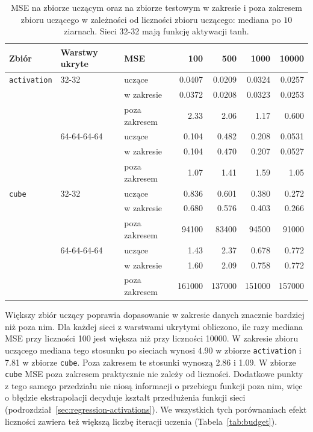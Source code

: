 \begin{table}[H]
    \centering
    \caption{MSE na zbiorze uczącym oraz na zbiorze testowym w zakresie i poza zakresem zbioru uczącego w zależności od liczności zbioru uczącego: mediana po $10$ ziarnach. Sieci 32-32 mają funkcję aktywacji tanh.}
    \label{tab:cross-size-regression}
    \begin{tabular}{lllrrrr}
        \toprule
        Zbiór & Warstwy ukryte & MSE & \num{100} & \num{500} & \num{1000} & \num{10000} \\
        \midrule
        \texttt{activation} & 32-32 & uczące & \num{0.0407} & \num{0.0209} & \num{0.0324} & \num{0.0257} \\
        & & w zakresie & \num{0.0372} & \num{0.0208} & \num{0.0323} & \num{0.0253} \\
        & & poza zakresem & \num{2.33} & \num{2.06} & \num{1.17} & \num{0.600} \\
        \addlinespace
        & 64-64-64-64 & uczące & \num{0.104} & \num{0.482} & \num{0.208} & \num{0.0531} \\
        & & w zakresie & \num{0.104} & \num{0.470} & \num{0.207} & \num{0.0527} \\
        & & poza zakresem & \num{1.07} & \num{1.41} & \num{1.59} & \num{1.05} \\
        \midrule
        \texttt{cube} & 32-32 & uczące & \num{0.836} & \num{0.601} & \num{0.380} & \num{0.272} \\
        & & w zakresie & \num{0.680} & \num{0.576} & \num{0.403} & \num{0.266} \\
        & & poza zakresem & \num{94100} & \num{83400} & \num{94500} & \num{91000} \\
        \addlinespace
        & 64-64-64-64 & uczące & \num{1.43} & \num{2.37} & \num{0.678} & \num{0.772} \\
        & & w zakresie & \num{1.60} & \num{2.09} & \num{0.758} & \num{0.772} \\
        & & poza zakresem & \num{161000} & \num{137000} & \num{151000} & \num{157000} \\
        \bottomrule
    \end{tabular}
\end{table}

Większy zbiór uczący poprawia dopasowanie w zakresie danych znacznie bardziej niż poza nim. Dla każdej sieci z warstwami ukrytymi obliczono, ile razy mediana MSE przy liczności \num{100} jest większa niż przy liczności \num{10000}. W zakresie zbioru uczącego mediana tego stosunku po sieciach wynosi \num{4.90} w zbiorze \texttt{activation} i \num{7.81} w zbiorze \texttt{cube}. Poza zakresem te stosunki wynoszą \num{2.86} i \num{1.09}. W zbiorze \texttt{cube} MSE poza zakresem praktycznie nie zależy od liczności. Dodatkowe punkty z tego samego przedziału nie niosą informacji o przebiegu funkcji poza nim, więc o błędzie ekstrapolacji decyduje kształt przedłużenia funkcji sieci (podrozdział~\ref{sec:regression-activations}). We wszystkich tych porównaniach efekt liczności zawiera też większą liczbę iteracji uczenia (Tabela~\ref{tab:budget}).

